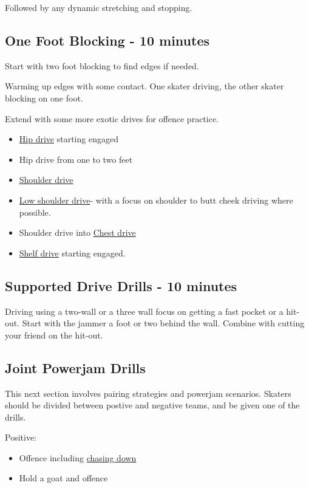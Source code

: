 \documentclass{journal}
\begin{document}
Followed by any dynamic stretching and stopping. 

\subsection*{One Foot Blocking - 10 minutes}

Start with two foot blocking to find edges if needed.

Warming up edges with some contact. 
One skater driving, the other skater blocking on one foot. 

Extend with some more exotic drives for offence practice. 


\begin{itemize}
\item \hyperref[drill:drives/hip]{Hip drive} starting engaged
\item Hip drive from one to two feet 
\item \hyperref[drill:drives/shoulder]{Shoulder drive} 
\item \hyperref[drill:drives/low_shoulder]{Low shoulder drive}- with a focus on shoulder to butt cheek driving where possible. 
\item Shoulder drive into \hyperref[drill:drives/chest]{Chest drive}
\item \hyperref[drill:drives/shelf]{Shelf drive} starting engaged.
\end{itemize}



\subsection*{Supported Drive Drills - 10 minutes}

Driving using a two-wall or a three wall focus on getting a fast pocket or a hit-out.
Start with the jammer a foot or two behind the wall.
Combine with cutting your friend on the hit-out.


\subsection*{Joint Powerjam Drills}
This next section involves pairing strategies and powerjam scenarios.
Skaters should be divided between postive and negative teams, and be given one of the drills.

Positive:
\begin{itemize}
\item Offence including \hyperref[drill:drives/shelf]{chasing down}
\item Hold a goat and offence
\end{itemize}
\end{document}
